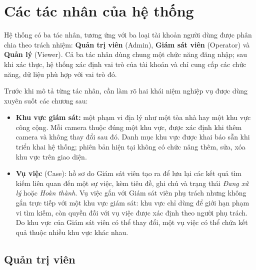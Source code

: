 \section{Các tác nhân của hệ thống}
\label{sec:4.1}

Hệ thống có ba tác nhân, tương ứng với ba loại tài khoản người dùng được phân chia theo trách nhiệm: \textbf{Quản trị viên} (Admin), \textbf{Giám sát viên} (Operator) và \textbf{Quản lý} (Viewer). Cả ba tác nhân dùng chung một chức năng đăng nhập; sau khi xác thực, hệ thống xác định vai trò của tài khoản và chỉ cung cấp các chức năng, dữ liệu phù hợp với vai trò đó.

Trước khi mô tả từng tác nhân, cần làm rõ hai khái niệm nghiệp vụ được dùng xuyên suốt các chương sau:
\begin{itemize}
    \item \textbf{Khu vực giám sát:} một phạm vi địa lý như một tòa nhà hay một khu vực công cộng. Mỗi camera thuộc đúng một khu vực, được xác định khi thêm camera và không thay đổi sau đó. Danh mục khu vực được khai báo sẵn khi triển khai hệ thống; phiên bản hiện tại không có chức năng thêm, sửa, xóa khu vực trên giao diện.
    \item \textbf{Vụ việc} (Case): hồ sơ do Giám sát viên tạo ra để lưu lại các kết quả tìm kiếm liên quan đến một sự việc, kèm tiêu đề, ghi chú và trạng thái \emph{Đang xử lý} hoặc \emph{Hoàn thành}. Vụ việc gắn với Giám sát viên phụ trách nhưng không gắn trực tiếp với một khu vực giám sát: khu vực chỉ dùng để giới hạn phạm vi tìm kiếm, còn quyền đối với vụ việc được xác định theo người phụ trách. Do khu vực của Giám sát viên có thể thay đổi, một vụ việc có thể chứa kết quả thuộc nhiều khu vực khác nhau.
\end{itemize}

\subsection{Quản trị viên}
\label{sec:4.1.1}

